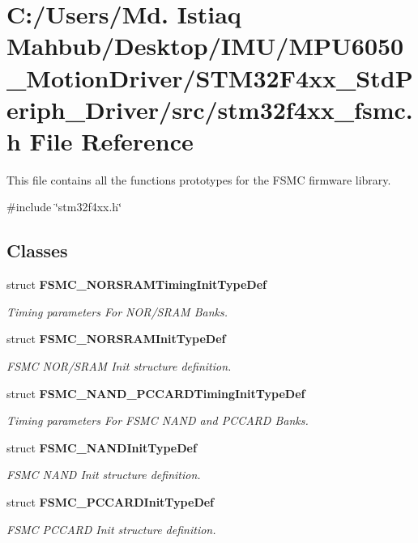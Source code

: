 \section{C\+:/\+Users/\+Md. Istiaq Mahbub/\+Desktop/\+I\+M\+U/\+M\+P\+U6050\+\_\+\+Motion\+Driver/\+S\+T\+M32\+F4xx\+\_\+\+Std\+Periph\+\_\+\+Driver/src/stm32f4xx\+\_\+fsmc.h File Reference}
\label{stm32f4xx__fsmc_8h}


This file contains all the functions prototypes for the F\+S\+MC firmware library.  


{\ttfamily \#include \char`\"{}stm32f4xx.\+h\char`\"{}}\newline
\subsection*{Classes}
\begin{DoxyCompactItemize}
\item 
struct \textbf{ F\+S\+M\+C\+\_\+\+N\+O\+R\+S\+R\+A\+M\+Timing\+Init\+Type\+Def}
\begin{DoxyCompactList}\small\item\em Timing parameters For N\+O\+R/\+S\+R\+AM Banks. \end{DoxyCompactList}\item 
struct \textbf{ F\+S\+M\+C\+\_\+\+N\+O\+R\+S\+R\+A\+M\+Init\+Type\+Def}
\begin{DoxyCompactList}\small\item\em F\+S\+MC N\+O\+R/\+S\+R\+AM Init structure definition. \end{DoxyCompactList}\item 
struct \textbf{ F\+S\+M\+C\+\_\+\+N\+A\+N\+D\+\_\+\+P\+C\+C\+A\+R\+D\+Timing\+Init\+Type\+Def}
\begin{DoxyCompactList}\small\item\em Timing parameters For F\+S\+MC N\+A\+ND and P\+C\+C\+A\+RD Banks. \end{DoxyCompactList}\item 
struct \textbf{ F\+S\+M\+C\+\_\+\+N\+A\+N\+D\+Init\+Type\+Def}
\begin{DoxyCompactList}\small\item\em F\+S\+MC N\+A\+ND Init structure definition. \end{DoxyCompactList}\item 
struct \textbf{ F\+S\+M\+C\+\_\+\+P\+C\+C\+A\+R\+D\+Init\+Type\+Def}
\begin{DoxyCompactList}\small\item\em F\+S\+MC P\+C\+C\+A\+RD Init structure definition. \end{DoxyCompactList}\end{DoxyCompactItemize}
